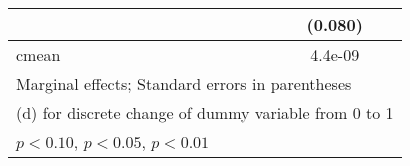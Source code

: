 \begin{table}[htbp]
\begin{tabular*}{1\hsize}{@{\hskip\tabcolsep\extracolsep\fill}l*{6}{c}}
                &                  &                  &                  &                  &                  &  (0.080)         \\
\midrule
cmean           &                  &                  &                  &                  &                  &  4.4e-09         \\
\bottomrule
\multicolumn{7}{l}{\footnotesize Marginal effects; Standard errors in parentheses}\\
\multicolumn{7}{l}{\footnotesize  (d) for discrete change of dummy variable from 0 to 1}\\
\multicolumn{7}{l}{\footnotesize \sym{*} \(p<0.10\), \sym{**} \(p<0.05\), \sym{***} \(p<0.01\)}\\
\end{tabular*}
\end{table}
